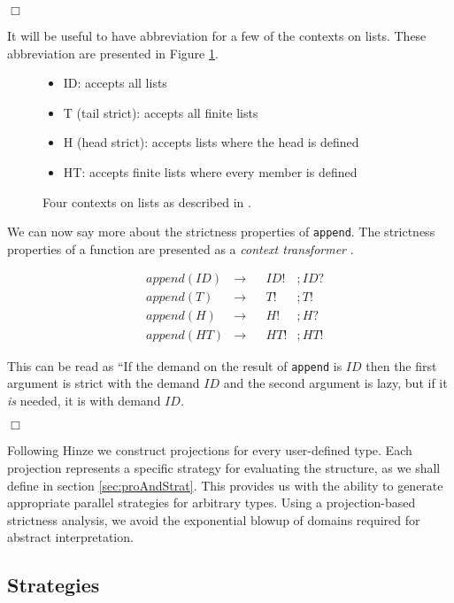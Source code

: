 \hfill$\Box$

It will be useful to have abbreviation for a few of the contexts on lists. These
abbreviation are presented in Figure \ref{contexts}.

\begin{figure}[h!]
\begin{itemize}
    \item[] ID: accepts all lists
    \item[] T (tail strict): accepts all finite lists
    \item[] H (head strict): accepts lists where the head is defined
    \item[] HT: accepts finite lists where every member is defined
\end{itemize}
\caption{Four contexts on lists as described in \citep{wadler1987projections}.}
\label{contexts}
\end{figure}

We can now say more about the strictness properties of \verb'append'. The
strictness properties of a function are presented as a \emph{context
transformer} \citep{hinze1995projection}. 

\begin{align*}
    &append(ID) &\rightarrow &&ID!&;ID? \\
    &append(T)  &\rightarrow &&T!&;T! \\
    &append(H)  &\rightarrow &&H!&;H? \\
    &append(HT) &\rightarrow &&HT!&;HT!
\end{align*}

This can be read as ``If the demand on the result of \verb-append- is $ID$
then the first argument is strict with the demand $ID$ and the second
argument is lazy, but if it \emph{is} needed, it is with demand $ID$.

\hfill$\Box$

Following Hinze \citep{hinze1995projection} we construct projections
for every user-defined type. Each projection represents a
specific strategy for evaluating the structure, as we shall define in section
\ref{sec:proAndStrat}.  This provides us with the ability to generate
appropriate parallel strategies for arbitrary types. Using a
projection-based strictness analysis, we avoid the exponential blowup
of domains required for abstract interpretation.

\subsection*{Strategies}

